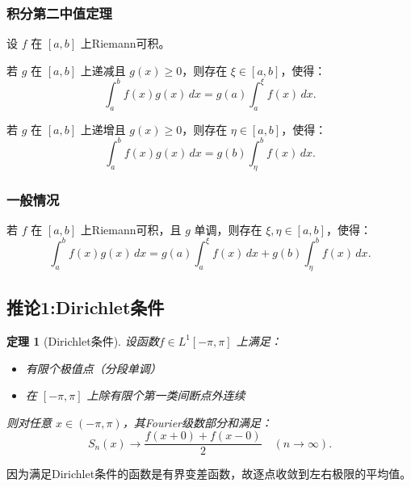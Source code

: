 \documentclass[12pt]{article}
\newtheorem{theorem}{定理}  %
\begin{document}
\subsubsection{积分第二中值定理}
设 \( f \) 在 \([a, b]\) 上Riemann可积。

若 \( g \) 在 \([a, b]\) 上递减且 \( g(x) \geq 0 \)，则存在 \(\xi \in [a, b]\)，使得：
\[
\int_a^b f(x) g(x) \, dx = g(a) \int_a^\xi f(x) \, dx.
\]

若 \( g \) 在 \([a, b]\) 上递增且 \( g(x) \geq 0 \)，则存在 \(\eta \in [a, b]\)，使得：
\[
\int_a^b f(x) g(x) \, dx = g(b) \int_\eta^b f(x) \, dx.
\]


\subsubsection{一般情况}

若 \( f \) 在 \([a, b]\) 上Riemann可积，且 \( g \) 单调，则存在 \(\xi, \eta \in [a, b]\)，使得：
\[
\int_a^b f(x) g(x) \, dx = g(a) \int_a^\xi f(x) \, dx + g(b) \int_\eta^b f(x) \, dx.
\]

\subsection{推论1:Dirichlet条件}
\begin{theorem}[Dirichlet条件]
	设函数$f \in L^1[-\pi, \pi]$ 上满足：
	\begin{itemize}
		\item 有限个极值点（分段单调）
		\item 在 $[-\pi, \pi]$ 上除有限个第一类间断点外连续
	\end{itemize}
	则对任意 $x \in (-\pi, \pi)$，其Fourier级数部分和满足：
	\[
	S_n(x) \to \frac{f(x+0) + f(x-0)}{2} \quad (n \to \infty).
	\]
\end{theorem}

因为满足Dirichlet条件的函数是有界变差函数，故逐点收敛到左右极限的平均值。
	
\end{document}
